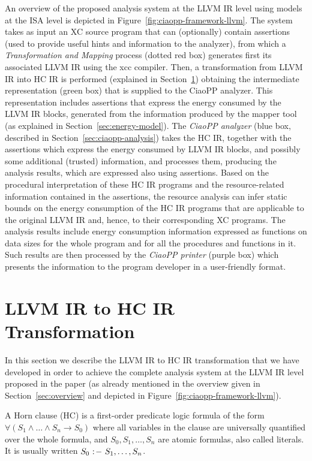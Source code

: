\documentclass{llncs}
\newcommand{\level}{level\xspace}
\newcommand{\hcir}{HC IR\xspace}
\newcommand{\llvmir}{LLVM IR\xspace}
\newcommand{\ciaopp}{CiaoPP\xspace}
\def\imp{\hbox{${\tt \ :\!-\ }$}}
\begin{document}
An overview of the proposed analysis system at the \llvmir \level
using models at the ISA \level is depicted in
Figure~\ref{fig:ciaopp-framework-llvm}.
The system takes as input an XC source program that can (optionally)
contain assertions (used to provide useful hints and information to
the analyzer), from which a \emph{Transformation and Mapping} process
(dotted red box) generates first its associated \llvmir using the xcc
compiler. Then, a transformation from \llvmir into \hcir is performed
(explained in Section~\ref{sec:llvm-ciao-translation}) obtaining the
intermediate representation (green box) that is supplied to the
\ciaopp analyzer. This representation includes assertions that express
the energy consumed by the \llvmir blocks, generated from the
information produced by the mapper tool (as explained in
Section~\ref{sec:energy-model}). The \emph{\ciaopp analyzer} (blue
box, described in Section~\ref{sec:ciaopp-analysis}) takes the \hcir,
together with the assertions which express the energy consumed by
\llvmir blocks, and possibly some additional (trusted) information,
and processes them, producing the analysis results, which are
expressed also using assertions.
Based on the procedural interpretation of these \hcir programs and 
the resource-related information contained in the assertions, the resource
analysis can infer static bounds on the energy
consumption of the \hcir programs that are applicable to the original
\llvmir and, hence, to their corresponding XC programs.
The analysis results include energy consumption information expressed
as functions on data sizes for the whole program and for all the
procedures and functions in it. Such results are then processed by the
\emph{\ciaopp printer} (purple box) which presents the
information to the program developer in a user-friendly format.

\section{\llvmir to \hcir Transformation}
\label{sec:llvm-ciao-translation}
In this section we describe the \llvmir to \hcir transformation that
we have developed in order to achieve the complete analysis system
at the \llvmir \level proposed in the paper (as already mentioned in the
overview given in Section~\ref{sec:overview} and depicted in
Figure~\ref{fig:ciaopp-framework-llvm}).

A Horn clause (HC) is a first-order predicate logic formula of the form $\forall (S_1 \wedge \ldots \wedge S_n \rightarrow S_0)$ where all variables in the clause are universally quantified over the whole formula, and $S_0,S_1,\ldots,S_n$ are atomic formulas, also called literals.  It is usually written $S_0 \imp S_1,\ldots,S_n$.
\end{document}
